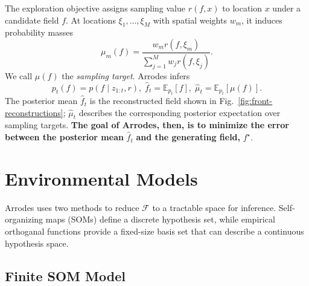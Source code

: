 \documentclass[letterpaper,10pt,conference]{ieeeconf}
\begin{document}
The exploration objective assigns sampling value $r(f,x)$ to location $x$ under a candidate field $f$. At locations $\xi_1,\ldots,\xi_M$ with spatial weights $w_m$, it induces probability masses
\begin{equation}
  \mu_m(f)=\frac{w_m r(f,\xi_m)}{\sum_{j=1}^{M}w_jr(f,\xi_j)}.
  \label{eq:target-measure}
\end{equation}
We call $\mu(f)$ the \emph{sampling target}. Arrodes infers
\begin{equation}
  p_t(f)=p(f\mid z_{1:t},r),\;
  \widehat f_t=\mathbb E_{p_t}[f],\;
  \widehat\mu_t=\mathbb E_{p_t}[\mu(f)].
  \label{eq:inference-problem}
\end{equation}
The posterior mean $\widehat f_t$ is the reconstructed field shown in Fig.~\ref{fig:front-reconstructions}; $\widehat\mu_t$ describes the corresponding posterior expectation over sampling targets. \textbf{The goal of Arrodes, then, is to minimize the error between the posterior mean}  $\widehat f_t$ \textbf{and the generating field,} $f^\star$.



\section{Environmental Models}

Arrodes uses two methods to reduce $\mathcal{F}$ to a tractable space for inference. Self-organizing maps (SOMs) define a discrete hypothesis set, while empirical orthoganal functions provide a fixed-size basis set that can describe a continuous hypothesis space.


\subsection{Finite SOM Model}
\end{document}
